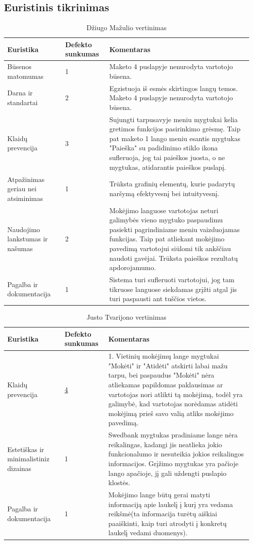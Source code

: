 \documentclass[oneside]{VUMIFPSkursinis}
\begin{document}
\subsection{Euristinis tikrinimas}
\begin{center}
\begin{longtable}[!htb]{|p{3.5cm}|p{1.9cm}|p{9.6cm}|}
	\caption{Džiugo Mažulio vertinimas}
	\endfirsthead
	\endhead
  \hline
	Euristika & Defekto sunkumas & Komentaras \\ \hline
	Būsenos matomumas & 1 & Maketo 4 puslapyje nenurodyta vartotojo būsena. \\ \hline
	Darna ir standartai & 2 & Egzistuoja iš esmės skirtingos langų temos. Maketo 4 puslapyje nenurodyta vartotojo būsena. \\ \hline
	Klaidų prevencija & 3 & Sujungti tarpusavyje meniu mygtukai kelia gretimos funkcijos pasirinkimo grėsmę. Taip pat maketo 1 lango meniu esantis mygtukas "Paieška" su padidinimo stiklo ikona sufleruoja, jog tai paieškos juosta, o ne mygtukas, atidarantis paieškos puslapį.\\ \hline
	Atpažinimas geriau nei atsiminimas & 1 & Trūksta grafinių elementų, kurie padarytų naršymą efektyvesnį bei intuityvesnį. \\ \hline
	Naudojimo lankstumas ir našumas & 2 & Mokėjimo languose vartotojas neturi galimybės vieno mygtuko paspaudimu pasiekti pagrindiniame meniu vaizduojamas funkcijas. Taip pat atliekant mokėjimo pavedimą vartotojui siūlomi tik ankščiau naudoti gavėjai. Trūksta paieškos rezultatų apdorojamumo. \\ \hline
	Pagalba ir dokumentacija & 1 & Sistema turi sufleruoti vartotojui, jog tam tikruose languose siekdamas grįžti atgal jis turi paspausti ant tuščios vietos. \\ \hline
\end{longtable}
\end{center}
\begin{center}
\begin{longtable}[!htb]{|p{3.5cm}|p{1.9cm}|p{9.6cm}|}
	\caption{Justo Tvarijono vertinimas}
	\endfirsthead
	\endhead
	\hline
	Euristika & Defekto sunkumas & Komentaras \\ \hline
	Klaidų prevencija \label{lentele:klaiduPrevencijaM} & \hyperref[fig:klaiduPrevencijaMygtukai2]{4} & 1. Vietinių mokėjimų lange mygtukai "Mokėti" ir "Atidėti" atskirti labai mažu tarpu, bei paspaudus "Mokėti" nėra atliekamas papildomas paklausimas ar vartotojas nori atlikti tą mokėjimą, todėl yra galimybė, kad vartotojas norėdamas atidėti mokėjimą prieš savo valią atliks mokėjimo pavedimą. \\ \hline
	Estetiškas ir minimalistiniz dizainas & 1 & Swedbank mygtukas pradiniame lange nėra reikalingas, kadangi jis neatlieka jokio funkcionalumo ir nesuteikia jokios reikalingos informacijos. Grįžimo mygtukas yra pačioje lango apačioje, jį gali uždengti puslapio klostės. \\ \hline
	Pagalba ir dokumentacija & 1 & Mokėjimo lange būtų gerai matyti informaciją apie laukelį į kurį yra vedama reikšmė(ta informacija turėtų aiškiai paaiškinti, kaip turi atrodyti į konkretų laukelį vedami duomenys). \\ \hline
\end{longtable}
\end{center}
\end{document}
